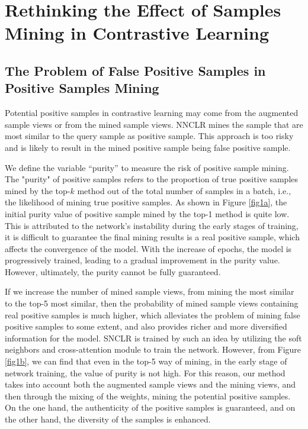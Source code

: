 \documentclass[review]{elsarticle}
\begin{document}
\section{Rethinking the Effect of Samples Mining in Contrastive Learning}
\label{chap3}
\subsection{The Problem of False Positive Samples in Positive Samples Mining}\label{chap3.1}
Potential positive samples in contrastive learning may come from the augmented sample views or from the mined sample views. NNCLR\cite{b12} mines the sample that are most similar to the query sample as positive sample. This approach is too risky and is likely to result in the mined positive sample being false positive sample.

We define the variable “purity” to measure the risk of positive sample mining. The "purity" of positive samples refers to the proportion of true positive samples mined by the top-$k$ method out of the total number of samples in a batch, i.e., the likelihood of mining true positive samples. As shown in
Figure \ref{fig1a}, the initial purity value of positive sample mined by the top-1 method is quite low. This is attributed to the network's instability during the early stages of training, it is difficult to guarantee the final mining results is a real positive sample, which affects the convergence of the model. With the increase of epochs, the model is progressively trained, leading to a gradual improvement in the purity value. However,  ultimately, the purity cannot be fully guaranteed.


If we increase the number of mined sample views, from mining the most similar to the top-5 most similar, then the probability of mined sample views containing real positive samples is much higher, which alleviates the problem of mining false positive samples to some extent, and also provides richer and more diversified information for the model. SNCLR\cite{b15} is trained by such an idea by utilizing the soft neighbors and cross-attention module to train the network. However, from Figure \ref{fig1b}, we can find that even in the top-5 way of mining, in the early stage of network training, the value of purity is not high. For this reason, our method takes into account both the augmented sample views and the mining views, and then through the mixing of the weights, mining the potential positive samples. On the one hand, the authenticity of the positive samples is guaranteed, and on the other hand, the diversity of the samples is enhanced.
\end{document}
